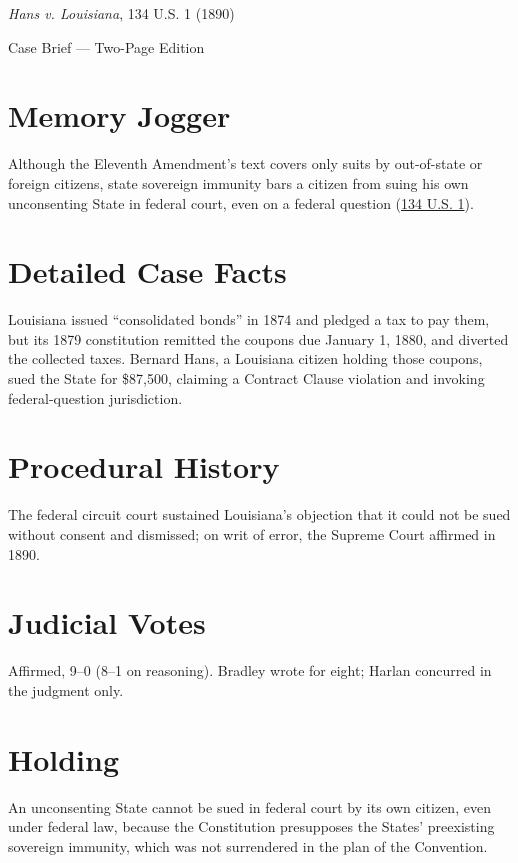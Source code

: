 \documentclass[12pt]{article}
\begin{document}
\begin{center}
{\LARGE \textit{Hans v. Louisiana}, 134 U.S. 1 (1890)\par}
\vspace{0.5em}
{\large Case Brief --- Two-Page Edition\par}
\end{center}

\section{Memory Jogger}
Although the Eleventh Amendment's text covers only suits by out-of-state or foreign citizens, state sovereign immunity bars a citizen from suing his own unconsenting State in federal court, even on a federal question (\href{https://supreme.justia.com/cases/federal/us/134/1/}{134 U.S. 1}).

\section{Detailed Case Facts}
Louisiana issued ``consolidated bonds'' in 1874 and pledged a tax to pay them, but its 1879 constitution remitted the coupons due January 1, 1880, and diverted the collected taxes. Bernard Hans, a Louisiana citizen holding those coupons, sued the State for \$87,500, claiming a Contract Clause violation and invoking federal-question jurisdiction.

\section{Procedural History}
The federal circuit court sustained Louisiana's objection that it could not be sued without consent and dismissed; on writ of error, the Supreme Court affirmed in 1890.

\section{Judicial Votes}
Affirmed, 9--0 (8--1 on reasoning). Bradley wrote for eight; Harlan concurred in the judgment only.

\section{Holding}
An unconsenting State cannot be sued in federal court by its own citizen, even under federal law, because the Constitution presupposes the States' preexisting sovereign immunity, which was not surrendered in the plan of the Convention.
\end{document}
